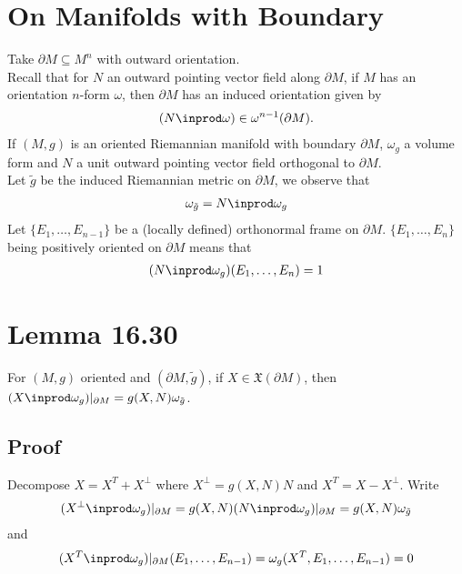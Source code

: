 \documentclass[11pt]{article}
\begin{document}
\section*{On Manifolds with Boundary}
\label{sec:org6498143}
Take \(\partial M\subseteq M^{n}\) with outward orientation.\\
Recall that for \(N\) an outward pointing vector field along \(\partial M\), if \(M\) has an orientation \(n\)-form \(\omega\), then \(\partial M\) has an induced orientation given by\\
\begin{align*}
  (N\inprod\omega)\in\omega^{n-1}(\partial M).
\end{align*}
If \((M,g)\) is an oriented Riemannian manifold with boundary \(\partial M\), \(\omega_{g}\) a volume form and \(N\) a unit outward pointing vector field orthogonal to \(\partial M\).\\
Let \(\tilde{g}\) be the induced Riemannian metric on \(\partial M\), we observe that\\
\begin{align*}
  \omega_{\tilde{g}}
  =N\inprod \omega_{g}
\end{align*}
Let \(\{E_{1},\ldots,E_{n-1}\}\) be a (locally defined) orthonormal frame on \(\partial M\). \(\{E_{1},\ldots,E_{n}\}\) being positively oriented on \(\partial M\) means that\\
\begin{align*}
  (N\inprod\omega_{g})(E_{1},\ldots,E_{n})=1
\end{align*}
\section*{Lemma 16.30}
\label{sec:org52c6bf3}
For \((M,g)\) oriented and \((\partial M,\tilde{g})\), if \(X\in\mathfrak{X}(\partial M)\), then \((X\inprod\omega_{g})|_{\partial M}=g(X,N)\omega_{\tilde{g}}\).\\
\subsection*{Proof}
\label{sec:org4d7319e}
Decompose \(X=X^{T}+X^{\perp}\) where \(X^{\perp}=g(X,N)N\) and \(X^{T}=X-X^{\perp}\). Write\\
\begin{align*}
  (X^{\perp}\inprod\omega_{g})|_{\partial M}
  =g(X,N)(N\inprod\omega_{g})|_{\partial M}
  =g(X,N)\omega_{\tilde{g}}
\end{align*}
and\\
\begin{align*}
  (X^{T}\inprod\omega_{g})|_{\partial M}(E_{1},\ldots,E_{n-1})
  =\omega_{g}(X^{T},E_{1},\ldots,E_{n-1})
  =0
\end{align*}
\end{document}
